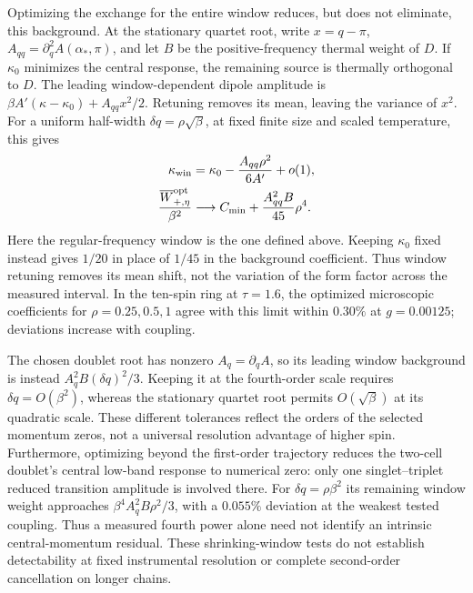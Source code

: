 Optimizing the exchange for the entire window reduces, but does not
eliminate, this background. At the stationary quartet root, write
$x=q-\pi$, $A_{qq}=\partial_q^2 A(\alpha_*,\pi)$, and let $B$ be the
positive-frequency thermal weight of $D$. If $\kappa_0$ minimizes the
central response, the remaining source is thermally orthogonal to $D$.
The leading window-dependent dipole amplitude is
$\beta A'(\kappa-\kappa_0)+A_{qq}x^2/2$.
Retuning removes its mean, leaving the variance of $x^2$.
For a uniform half-width $\delta q=\rho\sqrt{\beta}$, at fixed finite
size and scaled temperature, this gives
\begin{align}
 \kappa_{\rm win}&=\kappa_0-\frac{A_{qq}\rho^2}{6A'}+o(1),\notag\\
 \frac{\overline W^{\rm opt}_{+,\eta}}{\beta^2}
 &\longrightarrow C_{\min}+\frac{A_{qq}^2B}{45}\rho^4.
 \label{eq:window-retuning}
\end{align}
Here the regular-frequency window is the one defined above. Keeping
$\kappa_0$ fixed instead gives $1/20$ in place of $1/45$ in the
background coefficient. Thus window retuning removes its mean shift,
not the variation of the form factor across the measured interval.
In the ten-spin ring at $\tau=1.6$, the optimized microscopic
coefficients for $\rho=0.25,0.5,1$ agree with this limit within
$0.30\%$ at $g=0.00125$; deviations increase with coupling.

The chosen doublet root has nonzero $A_q=\partial_q A$, so its leading
window background is instead $A_q^2B(\delta q)^2/3$. Keeping it at
the fourth-order scale requires $\delta q=O(\beta^2)$, whereas the
stationary quartet root permits $O(\sqrt{\beta})$ at its quadratic
scale. These different tolerances reflect the orders of the selected
momentum zeros, not a universal resolution advantage of higher spin.
Furthermore, optimizing beyond the first-order trajectory reduces the
two-cell doublet's central low-band response to numerical zero: only
one singlet--triplet reduced transition amplitude is involved there.
For $\delta q=\rho\beta^2$ its remaining window weight approaches
$\beta^4 A_q^2B\rho^2/3$, with a $0.055\%$ deviation at the weakest
tested coupling. Thus a measured fourth power alone need not identify
an intrinsic central-momentum residual. These shrinking-window tests
do not establish detectability at fixed instrumental resolution or
complete second-order cancellation on longer chains.
